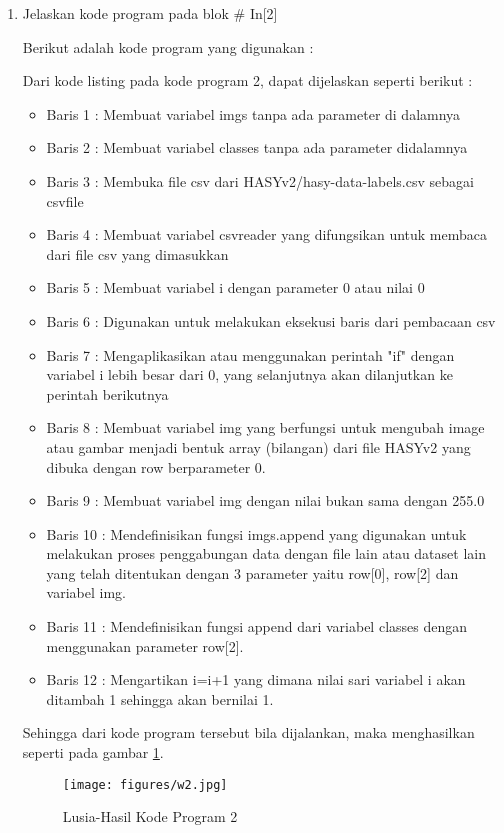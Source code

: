 \begin{enumerate}
\item Jelaskan kode program pada blok \# In[2]
	\par Berikut adalah kode program yang digunakan :
	
	\par Dari kode listing pada kode program 2, dapat dijelaskan seperti berikut :
	\begin{itemize}
	\item Baris 1	: Membuat variabel imgs tanpa ada parameter di dalamnya
	\item Baris 2	: Membuat variabel classes tanpa ada parameter didalamnya
	\item Baris 3	: Membuka file csv dari HASYv2/hasy-data-labels.csv sebagai csvfile
	\item Baris 4	: Membuat variabel csvreader yang difungsikan untuk membaca dari file csv yang dimasukkan
	\item Baris 5	: Membuat variabel i dengan parameter 0 atau nilai 0
	\item Baris 6	: Digunakan untuk melakukan eksekusi baris dari pembacaan csv 
	\item Baris 7	: Mengaplikasikan atau menggunakan perintah "if" dengan variabel i lebih besar dari 0, yang selanjutnya akan dilanjutkan ke perintah berikutnya
	\item Baris 8	: Membuat variabel img yang berfungsi untuk mengubah image atau gambar menjadi bentuk array (bilangan) dari file HASYv2 yang dibuka dengan row berparameter 0.
	\item Baris 9	: Membuat variabel img dengan nilai bukan sama dengan 255.0
	\item Baris 10	: Mendefinisikan fungsi imgs.append yang digunakan untuk melakukan proses penggabungan data dengan file lain atau dataset lain yang telah ditentukan dengan 3 parameter yaitu row[0], row[2] dan variabel img.
	\item Baris 11	: Mendefinisikan fungsi append dari variabel classes dengan menggunakan parameter row[2].
	\item Baris 12	: Mengartikan i=i+1 yang dimana nilai sari variabel i akan ditambah 1 sehingga akan bernilai 1.
	\end{itemize}
	\par Sehingga dari kode program tersebut bila dijalankan, maka menghasilkan seperti pada gambar \ref{7B2}.
		\begin{figure}[!hbtp]
		\centering
		\texttt{[image: figures/w2.jpg]}
		\caption{Lusia-Hasil Kode Program 2}
		\label{7B2}
		\end{figure}
	

\end{enumerate}
